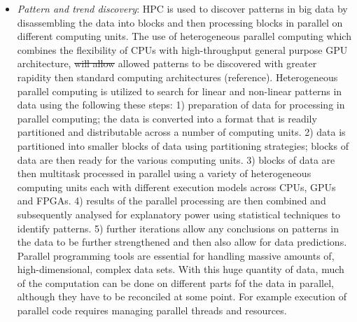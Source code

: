 \documentclass[10pt]{article}[draft]
\begin{document}
\begin{itemize}
\item \emph{Pattern and trend discovery}: HPC is used to discover patterns in big data by disassembling the data into blocks and then processing blocks in parallel on different computing units. The use of heterogeneous parallel computing which combines the flexibility of CPUs with high-throughput general purpose GPU architecture, \st{will allow} allowed patterns to be discovered with greater rapidity then standard computing architectures (reference). Heterogeneous parallel computing is utilized to search for linear and non-linear patterns in data using the following these steps: 1) preparation of data for processing in parallel computing; the data is converted into a format that is readily partitioned and distributable across a number of computing units. 2) data is  partitioned into smaller blocks of data using partitioning strategies; blocks of data are then ready for the various computing units.  3) blocks of data are then multitask processed in parallel using a variety of heterogeneous computing units each with different execution models across CPUs, GPUs and FPGAs. 4) results of the parallel processing are then combined and subsequently analysed for explanatory power using statistical techniques to identify patterns. 5) further iterations allow any conclusions on patterns in the data to be further strengthened and then also allow for data predictions. Parallel programming tools  are essential for handling  massive amounts of, high-dimensional, complex data sets. With this huge quantity of data, much of the computation can be done on different parts fof the data in parallel, although they have to be reconciled at some point. For example execution of parallel code requires managing parallel threads and resources.  

	
	
	
   

\end{itemize}
\end{document}
